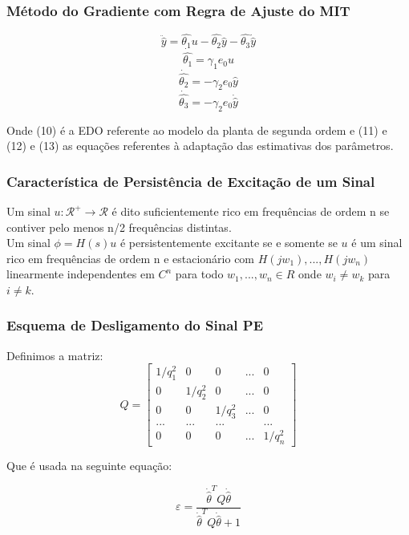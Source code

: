 \documentclass[aspectratio=169]{beamer}
\begin{document}
\begin{frame}
\frametitle{Método do Gradiente com Regra de Ajuste do MIT}

\begin{equation}
\ddot{\hat{y}} = \hat{\theta_1}u-\hat{\theta_2}\hat{y}- \hat{\theta_3}\dot{\hat{y}}
\end{equation}
\begin{equation}
\dot{\hat{\theta_1}} = \gamma_1e_0u
\end{equation}
\begin{equation}
\dot{\hat{\theta_2}} = -\gamma_2e_0\hat{y}
\end{equation}
\begin{equation}
\dot{\hat{\theta_3}} = -\gamma_2e_0\dot{\hat{y}}
\end{equation}


Onde (10) é a EDO referente ao modelo da planta de segunda ordem e (11) e (12) e (13) as equações referentes à adaptação das estimativas dos parâmetros.

\end{frame}

\begin{frame}
\frametitle{Característica de Persistência de Excitação de um Sinal}

 Um sinal $u:\mathcal{R}^+\rightarrow \mathcal{R}$ é dito suficientemente rico em frequências de ordem n se contiver pelo menos n/2 frequências distintas.\\

 Um sinal $\phi = H(s)u $ é persistentemente excitante se e somente se $u$ é um sinal rico em frequências de ordem n e estacionário com $H(jw_1),...,H(jw_n)$ linearmente independentes em $C^n$ para todo $w_1,...,w_n \in R$ onde $w_i\neq w_k$ para $i\neq k$. \\

\end{frame}
\begin{frame}
\frametitle{Esquema de Desligamento do Sinal PE}
Definimos a matriz: \[
Q=
  \begin{bmatrix}
    1/q_1^2 & 0       &  0       &  ... &  0      \\
    0       & 1/q_2^2 &  0       &  ... &  0      \\
    0       & 0       &  1/q_3^2 &  ... &  0      \\
    ...     & ...     &  ...     &      &  ...    \\
    0       & 0       &  0       &  ... & 1/q_n^2
  \end{bmatrix}
\]

Que é usada na seguinte equação:

\begin{equation}
\varepsilon = \frac{\dot{\hat{\theta}}^TQ\dot{\hat{\theta}}}{\dot{\hat{\theta}}^TQ\dot{\hat{\theta}}+1}
\end{equation}

\end{frame}
\end{document}

